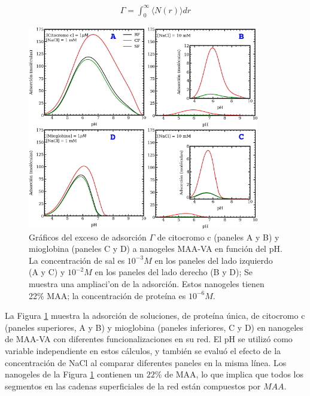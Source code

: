 %
\begin{align}
    \Gamma =  \int_0^\infty{  \langle N(r)\rangle dr}
\end{align}
%



\begin{figure}[!htb]
\includegraphics[width=0.9\textwidth]{Figures/graphs-gel2/ad-maa-pH-proteins.pdf}
\caption{Gr\'aficos del exceso de adsorci\'on $\Gamma$ de citocromo c (paneles A y B) y mioglobina (paneles C y D) a nanogeles MAA-VA en funci\'on del pH.
	La concentraci\'on de sal es $10^{-3}M$ en los paneles del lado izquierdo (A y C) y $10^{-2}M$ en los paneles del lado derecho
	(B y D); Se muestra una ampliaci'on de la adsorci\'on.
	Estos nanogeles tienen 22\% MAA; la concentraci\'on de prote\'ina es $10^{-6}M$.}
\label{fig:esf:adsorption-vs-pH-cyto-myo}
\end{figure}
 
 La Figura \ref{fig:esf:adsorption-vs-pH-cyto-myo} muestra la adsorci\'on de soluciones, de prote\'ina \'unica, de citocromo c (paneles superiores, A y B) y mioglobina (paneles inferiores, C y D) en nanogeles de MAA-VA con diferentes funcionalizaciones en su red. El pH se utiliz\'o como variable independiente en estos c\'alculos, y tambi\'en se evalu\'o el efecto de la concentraci\'on de NaCl al comparar diferentes paneles en la misma l\'inea. Los nanogeles de la Figura \ref{fig:esf:adsorption-vs-pH-cyto-myo} contienen un $22\%$ de MAA, lo que implica que todos los segmentos en las cadenas superficiales de la red est\'an compuestos por $MAA$.
 
